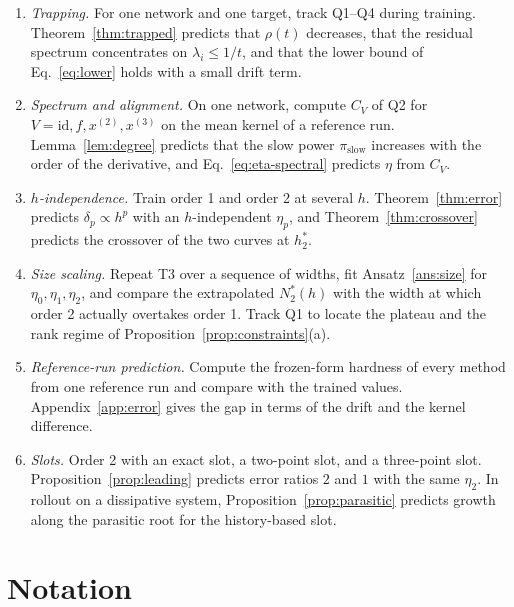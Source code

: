 \documentclass[11pt]{article}
\theoremstyle{definition}
\theoremstyle{remark}
\newcommand{\id}{\mathrm{id}}
\newcommand{\slow}{\mathrm{slow}}
\begin{document}
\begin{enumerate}[label=T\arabic*.]
\item \emph{Trapping.} For one network and one target, track Q1--Q4 during training. Theorem~\ref{thm:trapped} predicts that $\rho(t)$ decreases, that the residual spectrum concentrates on $\lambda_i \le 1/t$, and that the lower bound of Eq.~\eqref{eq:lower} holds with a small drift term.
\item \emph{Spectrum and alignment.} On one network, compute $C_V$ of Q2 for $V = \id, f, x^{(2)}, x^{(3)}$ on the mean kernel of a reference run. Lemma~\ref{lem:degree} predicts that the slow power $\pi_\slow$ increases with the order of the derivative, and Eq.~\eqref{eq:eta-spectral} predicts $\eta$ from $C_V$.
\item \emph{$h$-independence.} Train order 1 and order 2 at several $h$. Theorem~\ref{thm:error} predicts $\delta_p \propto h^p$ with an $h$-independent $\eta_p$, and Theorem~\ref{thm:crossover} predicts the crossover of the two curves at $h_2^\ast$.
\item \emph{Size scaling.} Repeat T3 over a sequence of widths, fit Ansatz~\ref{ans:size} for $\eta_0,\eta_1,\eta_2$, and compare the extrapolated $N_2^\ast(h)$ with the width at which order 2 actually overtakes order 1. Track Q1 to locate the plateau and the rank regime of Proposition~\ref{prop:constraints}(a).
\item \emph{Reference-run prediction.} Compute the frozen-form hardness of every method from one reference run and compare with the trained values. Appendix~\ref{app:error} gives the gap in terms of the drift and the kernel difference.
\item \emph{Slots.} Order 2 with an exact slot, a two-point slot, and a three-point slot. Proposition~\ref{prop:leading} predicts error ratios $2$ and $1$ with the same $\eta_2$. In rollout on a dissipative system, Proposition~\ref{prop:parasitic} predicts growth along the parasitic root for the history-based slot.
\end{enumerate}

\appendix
\section{Notation}\label{app:notation}
\end{document}
